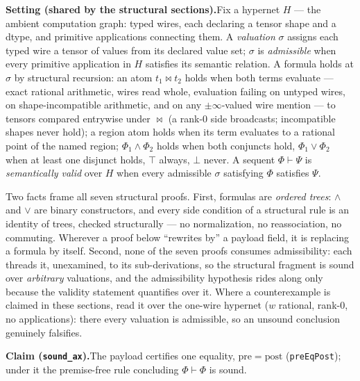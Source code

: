 

\textbf{Setting (shared by the structural sections).}\enspace Fix a
hypernet $H$ --- the ambient computation graph: typed wires, each
declaring a tensor shape and a dtype, and primitive applications
connecting them. A \emph{valuation} $\sigma$ assigns each typed wire a
tensor of values from its declared value set; $\sigma$ is
\emph{admissible} when every primitive application in $H$ satisfies its
semantic relation. A formula holds at $\sigma$ by structural recursion:
an atom $t_1 \bowtie t_2$ holds when both terms evaluate --- exact
rational arithmetic, wires read whole, evaluation failing on untyped
wires, on shape-incompatible arithmetic, and on any $\pm\infty$-valued
wire mention --- to tensors compared entrywise under $\bowtie$ (a rank-0
side broadcasts; incompatible shapes never hold); a region atom holds
when its term evaluates to a rational point of the named region;
$\Phi_1 \wedge \Phi_2$ holds when both conjuncts hold, $\Phi_1 \vee
\Phi_2$ when at least one disjunct holds, $\top$ always, $\bot$ never. A
sequent $\Phi \vdash \Psi$ is \emph{semantically valid} over $H$ when
every admissible $\sigma$ satisfying $\Phi$ satisfies $\Psi$.

Two facts frame all seven structural proofs. First, formulas are
\emph{ordered trees}: $\wedge$ and $\vee$ are binary constructors, and
every side condition of a structural rule is an identity of trees,
checked structurally --- no normalization, no reassociation, no
commuting. Wherever a proof below ``rewrites by'' a payload field, it is
replacing a formula by itself. Second, none of the seven proofs consumes
admissibility: each threads it, unexamined, to its sub-derivations, so
the structural fragment is sound over \emph{arbitrary} valuations, and
the admissibility hypothesis rides along only because the validity
statement quantifies over it. Where a counterexample is claimed in these
sections, read it over the one-wire hypernet ($w$ rational, rank-0, no
applications): there every valuation is admissible, so an unsound
conclusion genuinely falsifies.

\textbf{Claim (\texttt{sound\_ax}).}\enspace The payload certifies one
equality, $\mathrm{pre} = \mathrm{post}$ (\texttt{preEqPost}); under it
the premise-free rule concluding $\Phi \vdash \Phi$ is sound.


